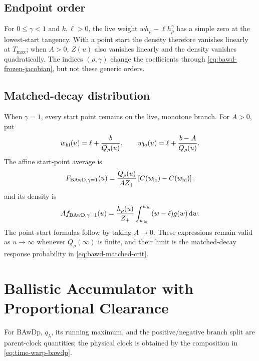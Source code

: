 \documentclass[12pt]{article}
\newcommand{\dd}{\,\mathrm{d}}
\theoremstyle{remark}
\begin{document}
\subsection{Endpoint order}
For $0\le\gamma<1$ and $k,\ell>0$, the live weight $w h_\rho-\ell h_\rho^\gamma$ has a simple zero at the lowest-start tangency. With a point start the density therefore vanishes linearly at $T_{\max}$; when $A>0$, $Z(u)$ also vanishes linearly and the density vanishes quadratically. The indices $(\rho,\gamma)$ change the coefficients through \eqref{eq:bawd-frozen-jacobian}, but not these generic orders.
\subsection{Matched-decay distribution}
When $\gamma=1$, every start point remains on the live, monotone branch. For $A>0$, put
\[
 w_{\rm hi}(u)=\ell+\frac{b}{Q_\rho(u)},\qquad
 w_{\rm lo}(u)=\ell+\frac{b-A}{Q_\rho(u)}.
\]
The affine start-point average is
\begin{equation}
 F_{\mathrm{BAwD},\gamma=1}(u)
 =\frac{Q_\rho(u)}{A Z_+}
   \left[C(w_{\rm lo})-C(w_{\rm hi})\right],
\label{eq:bawd-matched-cdf}
\end{equation}
and its density is
\begin{equation}
 A f_{\mathrm{BAwD},\gamma=1}(u)
 =\frac{h_\rho(u)}{Z_+}
   \int_{w_{\rm lo}}^{w_{\rm hi}}(w-\ell)g(w)\dd w.
\label{eq:bawd-matched-pdf}
\end{equation}
The point-start formulas follow by taking $A\to0$. These expressions remain valid as $u\to\infty$ whenever $Q_\rho(\infty)$ is finite, and their limit is the matched-decay response probability in \eqref{eq:bawd-matched-crit}.
\section{Ballistic Accumulator with Proportional Clearance}
\label{sec:bawdp}
For BAwDp, \(q_\lambda\), its running maximum, and the positive/negative branch split are parent-clock quantities; the physical clock is obtained by the composition in \eqref{eq:time-warp-bawdp}.
\end{document}
